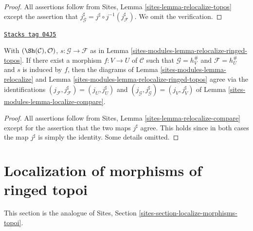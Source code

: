 \begin{proof}
All assertions follow from
Sites, Lemma \ref{sites-lemma-relocalize-topos}
except the assertion that
$j_\mathcal{G}^\sharp = j^\sharp \circ j^{-1}(j_\mathcal{F}^\sharp)$.
We omit the verification.
\end{proof}

\begin{lemma}
\label{sites-modules-lemma-relocalize-compare}
\href{https://stacks.math.columbia.edu/tag/04J5}{\texttt{Stacks tag 04J5}}

With $(\Sh(\mathcal{C}), \mathcal{O})$,
$s : \mathcal{G} \to \mathcal{F}$ as in
Lemma \ref{sites-modules-lemma-relocalize-ringed-topos}.
If there exist a morphism $f : V \to U$ of $\mathcal{C}$
such that $\mathcal{G} = h_V^\#$ and $\mathcal{F} = h_U^\#$
and $s$ is induced by $f$, then the
diagrams of
Lemma \ref{sites-modules-lemma-relocalize}
and
Lemma \ref{sites-modules-lemma-relocalize-ringed-topos}
agree via the identifications
$(j_\mathcal{F}, j_\mathcal{F}^\sharp) = (j_U, j_U^\sharp)$
and
$(j_\mathcal{G}, j_\mathcal{G}^\sharp) = (j_V, j_V^\sharp)$
of
Lemma \ref{sites-modules-lemma-localize-compare}.
\end{lemma}

\begin{proof}
All assertions follow from
Sites, Lemma \ref{sites-lemma-relocalize-compare}
except for the assertion that the two maps $j^\sharp$
agree. This holds since in both cases the map
$j^\sharp$ is simply the identity. Some details omitted.
\end{proof}

\section{Localization of morphisms of ringed topoi}
\label{sites-modules-section-localize-morphisms-ringed-topoi}
This section is the analogue of
Sites, Section \ref{sites-section-localize-morphisms-topoi}.

